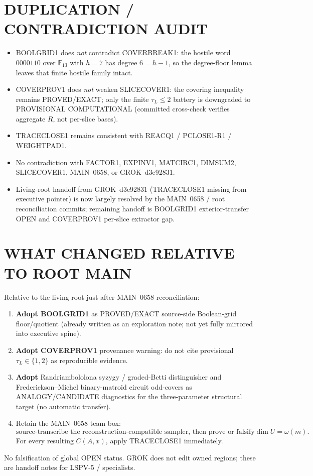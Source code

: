 \documentclass[11pt]{article}
\begin{document}
\section*{DUPLICATION / CONTRADICTION AUDIT}
\begin{itemize}
\item BOOLGRID1 does \emph{not} contradict COVERBREAK1: the hostile word $0000110$ over
$\mathbb F_{13}$ with $h=7$ has degree $6=h-1$, so the degree-floor lemma leaves that
finite hostile family intact.
\item COVERPROV1 does \emph{not} weaken SLICECOVER1: the covering inequality remains
PROVED/EXACT; only the finite $\tau_L\le 2$ battery is downgraded to PROVISIONAL
COMPUTATIONAL (committed cross-check verifies aggregate $R$, not per-slice bases).
\item TRACECLOSE1 remains consistent with REACQ1 / PCLOSE1-R1 / WEIGHTPAD1.
\item No contradiction with FACTOR1, EXPINV1, MATCIRC1, DIMSUM2, SLICECOVER1, MAIN~0658,
or GROK~d3e92831.
\item Living-root handoff from GROK~d3e92831 (TRACECLOSE1 missing from executive pointer)
is now largely resolved by the MAIN~0658 / root reconciliation commits; remaining handoff
is BOOLGRID1 exterior-transfer OPEN and COVERPROV1 per-slice extractor gap.
\end{itemize}

\section*{WHAT CHANGED RELATIVE TO ROOT MAIN}
Relative to the living root just after MAIN~0658 reconciliation:
\begin{enumerate}
\item \textbf{Adopt BOOLGRID1} as PROVED/EXACT source-side Boolean-grid floor/quotient
  (already written as an exploration note; not yet fully mirrored into executive spine).
\item \textbf{Adopt COVERPROV1} provenance warning: do not cite provisional $\tau_L\in\{1,2\}$
  as reproducible evidence.
\item \textbf{Adopt} Randriambololona syzygy / graded-Betti distinguisher and
  Frederickson--Michel binary-matroid circuit odd-covers as ANALOGY/CANDIDATE diagnostics
  for the three-parameter structural target (no automatic transfer).
\item Retain the MAIN~0658 team box:
\[
\boxed{\text{source-transcribe the reconstruction-compatible sampler, then prove or falsify
}\dim U=\omega(m).}
\]
For every resulting $C(A,x)$, apply TRACECLOSE1 immediately.
\end{enumerate}
No falsification of global OPEN status. GROK does not edit owned regions; these are
handoff notes for LSPV-5 / specialists.
\end{document}

